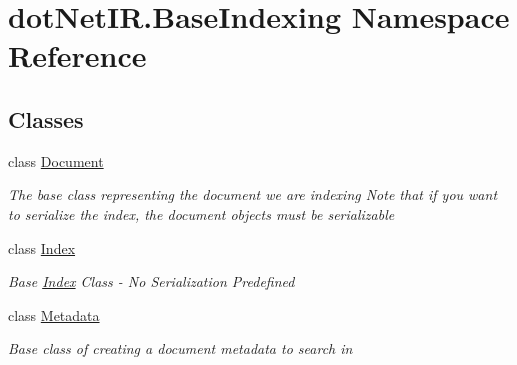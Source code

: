 \hypertarget{namespacedot_net_i_r_1_1_base_indexing}{}\section{dot\+Net\+I\+R.\+Base\+Indexing Namespace Reference}
\label{namespacedot_net_i_r_1_1_base_indexing}
\subsection*{Classes}
\begin{DoxyCompactItemize}
\item 
class \hyperlink{classdot_net_i_r_1_1_base_indexing_1_1_document}{Document}
\begin{DoxyCompactList}\small\item\em The base class representing the document we are indexing Note that if you want to serialize the index, the document objects must be serializable \end{DoxyCompactList}\item 
class \hyperlink{classdot_net_i_r_1_1_base_indexing_1_1_index}{Index}
\begin{DoxyCompactList}\small\item\em Base \hyperlink{classdot_net_i_r_1_1_base_indexing_1_1_index}{Index} Class -\/ No Serialization Predefined \end{DoxyCompactList}\item 
class \hyperlink{classdot_net_i_r_1_1_base_indexing_1_1_metadata}{Metadata}
\begin{DoxyCompactList}\small\item\em Base class of creating a document metadata to search in \end{DoxyCompactList}\end{DoxyCompactItemize}

